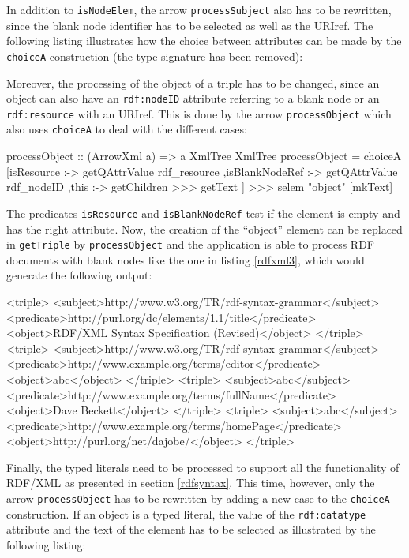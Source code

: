 \documentclass[11pt,a4paper,headsepline, bibtotoc]{scrreprt}
\begin{document}
In addition to \texttt{isNodeElem}, the arrow \texttt{processSubject} also has to be rewritten, since the blank node identifier has to be selected as well as the URIref. The following listing illustrates how the choice between attributes can be made by the \texttt{choiceA}-construction (the type signature has been removed):
Moreover, the processing of the object of a triple has to be changed, since an object can also have an \texttt{rdf:nodeID} attribute referring to a blank node or an \texttt{rdf:resource} with an URIref. This is done by the arrow \texttt{processObject} which also uses \texttt{choiceA} to deal with the different cases:
\begin{code}
processObject :: (ArrowXml a) => a XmlTree XmlTree
processObject
  = choiceA [isResource     :-> getQAttrValue rdf_resource 
            ,isBlankNodeRef :-> getQAttrValue rdf_nodeID
            ,this           :-> getChildren >>> getText 
            ]
    >>>
    selem "object" [mkText]
\end{code}
The predicates \texttt{isResource} and \texttt{isBlankNodeRef} test if the element is empty and has the right attribute. Now, the creation of the ``object'' element can be replaced in \texttt{getTriple} by \texttt{processObject} and the application is able to process RDF documents with blank nodes like the one in listing \ref{rdfxml3}, which would generate the following output:
\begin{blank}
<triple>
  <subject>http://www.w3.org/TR/rdf-syntax-grammar</subject>
  <predicate>http://purl.org/dc/elements/1.1/title</predicate>
  <object>RDF/XML Syntax Specification (Revised)</object>
</triple>
<triple>
  <subject>http://www.w3.org/TR/rdf-syntax-grammar</subject>
  <predicate>http://www.example.org/terms/editor</predicate>
  <object>abc</object>
</triple>
<triple>
  <subject>abc</subject>
  <predicate>http://www.example.org/terms/fullName</predicate>
  <object>Dave Beckett</object>
</triple>
<triple>
  <subject>abc</subject>
  <predicate>http://www.example.org/terms/homePage</predicate>
  <object>http://purl.org/net/dajobe/</object>
</triple>
\end{blank}
Finally, the typed literals need to be processed to support all the functionality of \mbox{RDF/XML} as presented in section \ref{rdfsyntax}. This time, however, only the arrow \texttt{process\-Object} has to be rewritten by adding a new case to the \texttt{choiceA}-construction. If an object is a typed literal, the value of the \texttt{rdf:datatype} attribute and the text of the element has to be selected as illustrated by the following listing: 
\end{document}
